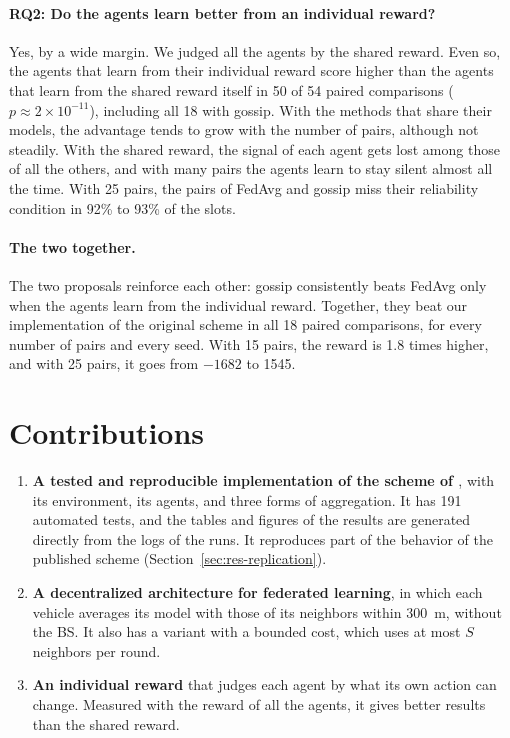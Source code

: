 \paragraph{RQ2: Do the agents learn better from an individual reward?} Yes, by a wide margin. We judged all the
agents by the shared reward. Even so, the agents that learn from their individual reward score higher than the
agents that learn from the shared reward itself in 50 of 54 paired comparisons
($p \approx 2 \times 10^{-11}$), including all 18 with gossip. With the methods that share their models, the
advantage tends to grow with the number of pairs, although not steadily. With the shared reward, the signal of
each agent gets lost among those of all the others, and with many pairs the agents learn to stay silent almost
all the time. With 25 pairs, the pairs of \ac{FedAvg} and gossip miss their reliability condition in 92\% to
93\% of the slots.

\paragraph{The two together.} The two proposals reinforce each other: gossip consistently beats \ac{FedAvg} only
when the agents learn from the individual reward. Together, they beat our implementation of the original scheme
in all 18 paired comparisons, for every number of pairs and every seed. With 15 pairs, the reward is 1.8 times
higher, and with 25 pairs, it goes from $-1682$ to 1545.

\section{Contributions}
\label{sec:conc-contributions}

\begin{enumerate}
  \item \textbf{A tested and reproducible implementation of the scheme of \citet{li+22fedmarl}}, with its
    environment, its agents, and three forms of aggregation. It has 191 automated tests, and the tables and
    figures of the results are generated directly from the logs of the runs. It reproduces part of the
    behavior of the published scheme (Section~\ref{sec:res-replication}).
  \item \textbf{A decentralized architecture for federated learning}, in which each vehicle averages its model
    with those of its neighbors within \SI{300}{\meter}, without the \ac{BS}. It also has a variant with a
    bounded cost, which uses at most $S$ neighbors per round.
  \item \textbf{An individual reward} that judges each agent by what its own action can change. Measured with
    the reward of all the agents, it gives better results than the shared reward.
\end{enumerate}

